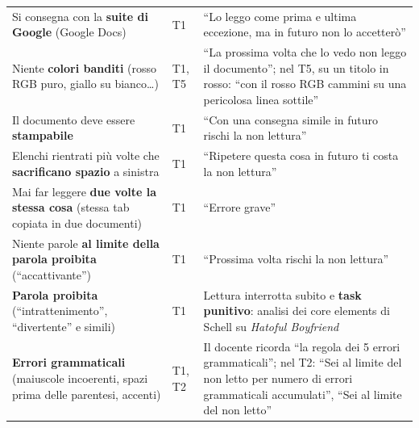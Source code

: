 \begin{table}[htbp]
\begin{tabular}{@{}p{5.1cm}p{1.1cm}p{5.6cm}@{}}
    \addlinespace
    Si consegna con la \textbf{suite di Google} (Google Docs) &
      T1 & ``Lo leggo come prima e ultima eccezione, ma in futuro non lo
      accetterò'' \\
    \addlinespace
    Niente \textbf{colori banditi} (rosso RGB puro, giallo su bianco\dots) &
      T1, T5 & ``La prossima volta che lo vedo non leggo il documento''; nel
      T5, su un titolo in rosso: ``con il rosso RGB cammini su una pericolosa
      linea sottile'' \\
    \addlinespace
    Il documento deve essere \textbf{stampabile} &
      T1 & ``Con una consegna simile in futuro rischi la non lettura'' \\
    \addlinespace
    Elenchi rientrati più volte che \textbf{sacrificano spazio} a sinistra &
      T1 & ``Ripetere questa cosa in futuro ti costa la non lettura'' \\
    \addlinespace
    Mai far leggere \textbf{due volte la stessa cosa} (stessa tab copiata
    in due documenti) &
      T1 & ``Errore grave'' \\
    \addlinespace
    Niente parole \textbf{al limite della parola proibita}
    (``accattivante'') &
      T1 & ``Prossima volta rischi la non lettura'' \\
    \addlinespace
    \textbf{Parola proibita} (``intrattenimento'', ``divertente'' e
    simili) &
      T1 & Lettura interrotta subito e \textbf{task punitivo}: analisi dei
      core elements di Schell su \emph{Hatoful Boyfriend} \\
    \addlinespace
    \textbf{Errori grammaticali} (maiuscole incoerenti, spazi prima delle
    parentesi, accenti) &
      T1, T2 & Il docente ricorda ``la regola dei 5 errori grammaticali''; nel
      T2: ``Sei al limite del non letto per numero di errori grammaticali
      accumulati'', ``Sei al limite del non letto'' \\
    \bottomrule
  \end{tabular}
\end{table}


